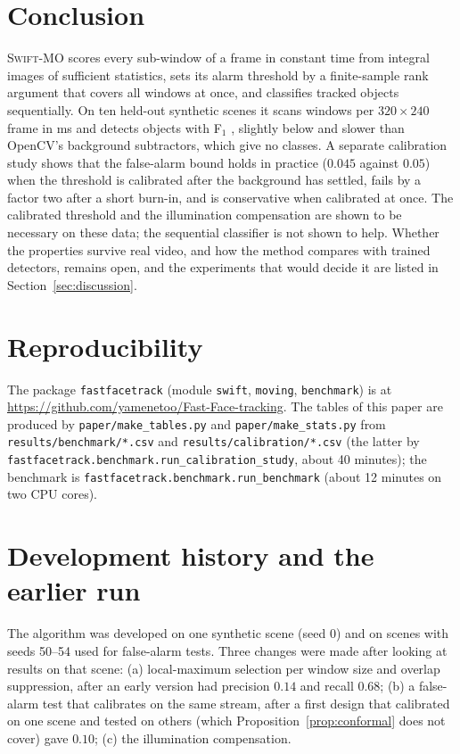 \documentclass[11pt,a4paper]{article}
\theoremstyle{definition}
\newcommand{\swift}{\textsc{Swift-MO}}
\begin{document}
\section{Conclusion}\label{sec:conclusion}
\swift{} scores every sub-window of a frame in constant time from integral images of sufficient statistics, sets its alarm threshold by a finite-sample rank argument that covers all windows at once, and classifies tracked objects sequentially.
On ten held-out synthetic scenes it scans \NwinPerFrame{} windows per $320\times240$ frame in \msSwift{} ms and detects objects with F$_1$ \fSwift{}, slightly below and slower than OpenCV's background subtractors, which give no classes.
A separate calibration study shows that the false-alarm bound holds in practice ($0.045$ against $0.05$) when the threshold is calibrated after the background has settled, fails by a factor two after a short burn-in, and is conservative when calibrated at once. The calibrated threshold and the illumination compensation are shown to be necessary on these data; the sequential classifier is not shown to help.
Whether the properties survive real video, and how the method compares with trained detectors, remains open, and the experiments that would decide it are listed in Section~\ref{sec:discussion}.

\section*{Reproducibility}
The package \texttt{fastfacetrack} (module \texttt{swift}, \texttt{moving}, \texttt{benchmark}) is at \url{https://github.com/yamenetoo/Fast-Face-tracking}.
The tables of this paper are produced by \texttt{paper/make\_tables.py} and \texttt{paper/make\_stats.py} from \texttt{results/benchmark/*.csv} and \texttt{results/calibration/*.csv} (the latter by \texttt{fastfacetrack.benchmark.run\_calibration\_study}, about 40 minutes); the benchmark is \texttt{fastfacetrack.benchmark.run\_benchmark} (about 12 minutes on two CPU cores).

\appendix
\section{Development history and the earlier run}\label{app:history}
The algorithm was developed on one synthetic scene (seed 0) and on scenes with seeds 50--54 used for false-alarm tests.
Three changes were made after looking at results on that scene: (a) local-maximum selection per window size and overlap suppression, after an early version had precision $0.14$ and recall $0.68$; (b) a false-alarm test that calibrates on the same stream, after a first design that calibrated on one scene and tested on others (which Proposition~\ref{prop:conformal} does not cover) gave $0.10$; (c) the illumination compensation.
\end{document}
